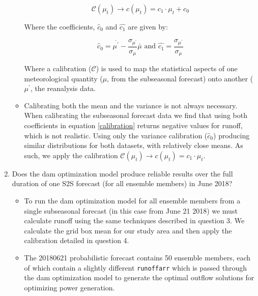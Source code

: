 \documentclass[11pt]{article}
\begin{document}
\begin{enumerate}
\begin{itemize}
            \begin{equation}
                \mathcal{C}\left(\mu_t\right) \rightarrow c\left(\mu_t\right)=c_1 \cdot \mu_t+c_0
                \label{calibration}
            \end{equation}

            Where the coefficients, $\hat{c}_0$ and $\hat{c_1}$ are given by:

            \begin{equation}
                \hat{c}_0=\overline{\mu^{\prime}}-\frac{\sigma_{\mu^{\prime}}}{\sigma_\mu} \bar{\mu} \text { and } \hat{c_1}=\frac{\sigma_{\mu^{\prime}}}{\sigma_\mu}
                \label{calibration_coeff}
            \end{equation}

            Where a calibration ($\mathcal{C}$) is used to map the statistical aspects of one meteorological quantity ($\mu$, from the subseasonal forecast) onto another ($\mu^{\prime}$, the reanalysis data.
            \item Calibrating both the mean and the variance is not always necessary. When calibrating the subseasonal forecast data we find that using both coefficients in equation \ref{calibration} returns negative values for runoff, which is not realistic. Using only the variance calibration ($\hat{c}_0$) producing similar distributions for both datasets, with relatively close means. As such, we apply the calibration $\mathcal{C}\left(\mu_t\right) \rightarrow c\left(\mu_t\right)=c_1 \cdot \mu_t$.
        \end{itemize}
    \item Does the dam optimization model produce reliable results over the full duration of one S2S forecast (for all ensemble members) in June 2018?
        \begin{itemize}
            \item To run the dam optimization model for all ensemble members from a single subseasonal forecast (in this case from June 21 2018) we must calculate runoff using the same techniques described in question 3. We calculate the grid box mean for our study area and then apply the calibration detailed in question 4.
            \item The 20180621 probabilistic forecast contains 50 ensemble members, each of which contain a slightly different \texttt{runoffarr} which is passed through the dam optimization model to generate the optimal outflow solutions for optimizing power generation.

\end{itemize}
\end{enumerate}
\end{document}
